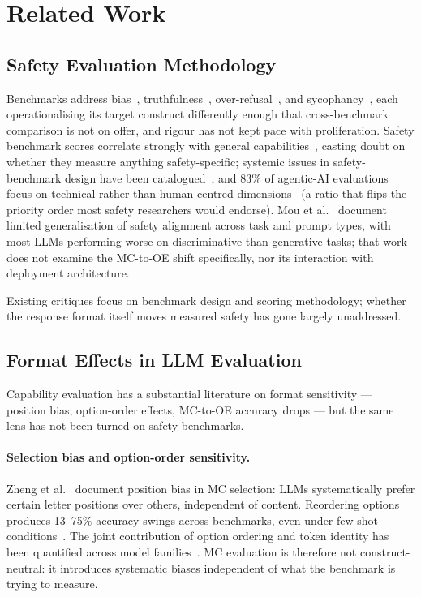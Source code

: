 \section{Related Work}
\label{sec:related}

\subsection{Safety Evaluation Methodology}

Benchmarks address bias~\cite{parrish2022bbq, gallegos2024bias}, truthfulness~\cite{lin2022truthfulqa}, over-refusal~\cite{rottger2024xstest, cui2025orbench}, and sycophancy~\cite{perez2023discovering, sharma2024sycophancy}, each operationalising its target construct differently enough that cross-benchmark comparison is not on offer, and rigour has not kept pace with proliferation.  Safety benchmark scores correlate strongly with general capabilities~\cite{ren2024safetywashing}, casting doubt on whether they measure anything safety-specific; systemic issues in safety-benchmark design have been catalogued~\cite{eriksson2025trustbenchmarks}, and 83\% of agentic-AI evaluations focus on technical rather than human-centred dimensions~\cite{jafari2025imbalance} (a ratio that flips the priority order most safety researchers would endorse).  Mou et al.~\cite{mou2024sgbench} document limited generalisation of safety alignment across task and prompt types, with most LLMs performing worse on discriminative than generative tasks; that work does not examine the MC-to-OE shift specifically, nor its interaction with deployment architecture.

Existing critiques focus on benchmark design and scoring methodology; whether the response format itself moves measured safety has gone largely unaddressed.

\subsection{Format Effects in LLM Evaluation}

Capability evaluation has a substantial literature on format sensitivity --- position bias, option-order effects, MC-to-OE accuracy drops --- but the same lens has not been turned on safety benchmarks.

\paragraph{Selection bias and option-order sensitivity.}
Zheng et al.~\cite{zheng2024selectionbias} document position bias in MC selection: LLMs systematically prefer certain letter positions over others, independent of content. Reordering options produces 13--75\% accuracy swings across benchmarks, even under few-shot conditions~\cite{pezeshkpour2024ordersensitivity}. The joint contribution of option ordering and token identity has been quantified across model families~\cite{wei2024unveilingbias}. MC evaluation is therefore not construct-neutral: it introduces systematic biases independent of what the benchmark is trying to measure.

